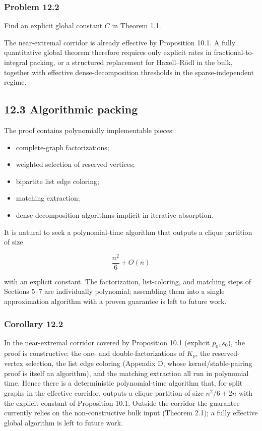 \documentclass[
  11pt,
]{article}
\providecommand{\tightlist}{%
  \setlength{\itemsep}{0pt}\setlength{\parskip}{0pt}}
\begin{document}
\subsubsection{Problem 12.2}\label{problem-12.2}

Find an explicit global constant \(C\) in Theorem 1.1.

The near-extremal corridor is already effective by Proposition 10.1. A
fully quantitative global theorem therefore requires only explicit rates
in fractional-to-integral packing, or a structured replacement for
Haxell--Rödl in the bulk, together with effective dense-decomposition
thresholds in the sparse-independent regime.

\subsection{12.3 Algorithmic packing}\label{algorithmic-packing}

The proof contains polynomially implementable pieces:

\begin{itemize}
\tightlist
\item
  complete-graph factorizations;
\item
  weighted selection of reserved vertices;
\item
  bipartite list edge coloring;
\item
  matching extraction;
\item
  dense decomposition algorithms implicit in iterative absorption.
\end{itemize}

It is natural to seek a polynomial-time algorithm that outputs a clique
partition of size

\[
\frac{n^2}{6}+O(n)
\]

with an explicit constant. The factorization, list-coloring, and
matching steps of Sections 5--7 are individually polynomial; assembling
them into a single approximation algorithm with a proven guarantee is
left to future work.

\subsubsection{Corollary 12.2}\label{corollary-12.2-effective-corridor-algorithm}

In the near-extremal corridor covered by Proposition 10.1 (explicit
\(p_0,s_0\)), the proof is constructive: the one- and
double-factorizations of \(K_p\), the reserved-vertex selection, the
list edge coloring (Appendix D, whose kernel/stable-pairing proof is
itself an algorithm), and the matching extraction all run in polynomial
time. Hence there is a deterministic polynomial-time algorithm that, for
split graphs in the effective corridor, outputs a clique partition of
size \(n^2/6+2n\) with the explicit constant of Proposition 10.1.
Outside the corridor the guarantee currently relies on the
non-constructive bulk input (Theorem 2.1); a fully effective global
algorithm is left to future work.
\end{document}
